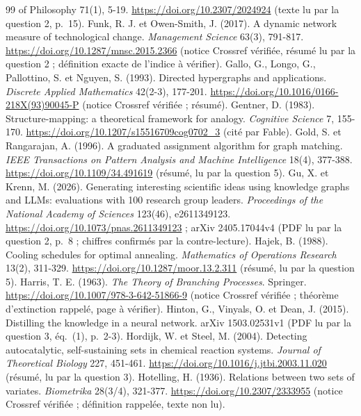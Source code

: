 \documentclass[11pt,a4paper]{article}
\theoremstyle{definition}
\theoremstyle{plain}
\begin{document}
\begin{thebibliography}{99}
{of Philosophy} 71(1), 5-19. \url{https://doi.org/10.2307/2024924} (texte lu par la question 2, p.~15).
 Funk, R. J. et Owen-Smith, J. (2017). A dynamic network measure of technological
change. \emph{Management Science} 63(3), 791-817. \url{https://doi.org/10.1287/mnsc.2015.2366} (notice
Crossref vérifiée, résumé lu par la question 2 ; définition exacte de l'indice à vérifier).
 Gallo, G., Longo, G., Pallottino, S. et Nguyen, S. (1993). Directed hypergraphs and
applications. \emph{Discrete Applied Mathematics} 42(2-3), 177-201.
\url{https://doi.org/10.1016/0166-218X(93)90045-P} (notice Crossref vérifiée ; résumé).
 Gentner, D. (1983). Structure-mapping: a theoretical framework for analogy.
\emph{Cognitive Science} 7, 155-170. \url{https://doi.org/10.1207/s15516709cog0702_3} (cité par Fable).
 Gold, S. et Rangarajan, A. (1996). A graduated assignment algorithm for
graph matching. \emph{IEEE Transactions on Pattern Analysis and Machine Intelligence} 18(4), 377-388.
\url{https://doi.org/10.1109/34.491619} (résumé, lu par la question 5).
 Gu, X. et Krenn, M. (2026). Generating interesting scientific ideas using
knowledge graphs and LLMs: evaluations with 100 research group leaders. \emph{Proceedings of the
National Academy of Sciences} 123(46), e2611349123. \url{https://doi.org/10.1073/pnas.2611349123} ;
arXiv 2405.17044v4 (PDF lu par la question 2, p.~8 ; chiffres confirmés par la contre-lecture).
 Hajek, B. (1988). Cooling schedules for optimal annealing. \emph{Mathematics of
Operations Research} 13(2), 311-329. \url{https://doi.org/10.1287/moor.13.2.311} (résumé, lu par la
question 5).
 Harris, T. E. (1963). \emph{The Theory of Branching Processes}. Springer.
\url{https://doi.org/10.1007/978-3-642-51866-9} (notice Crossref vérifiée ; théorème d'extinction
rappelé, page à vérifier).
 Hinton, G., Vinyals, O. et Dean, J. (2015). Distilling the knowledge in a neural
network. arXiv 1503.02531v1 (PDF lu par la question 3, éq.~(1), p.~2-3).
 Hordijk, W. et Steel, M. (2004). Detecting autocatalytic, self-sustaining sets in
chemical reaction systems. \emph{Journal of Theoretical Biology} 227, 451-461.
\url{https://doi.org/10.1016/j.jtbi.2003.11.020} (résumé, lu par la question 3).
 Hotelling, H. (1936). Relations between two sets of variates. \emph{Biometrika}
28(3/4), 321-377. \url{https://doi.org/10.2307/2333955} (notice Crossref vérifiée ; définition
rappelée, texte non lu).

\end{thebibliography}
\end{document}
